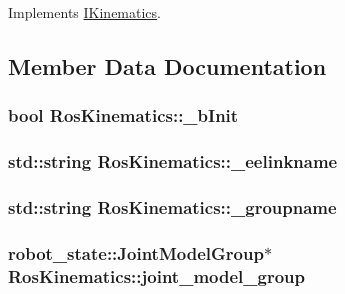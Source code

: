 Implements \hyperlink{classIKinematics_ad43b2185f06e20eb0bf9d5a94d4aec18}{I\-Kinematics}.



\subsection{Member Data Documentation}
\hypertarget{classRosKinematics_a3cae7f7ad57a5df821c2ebf8b55057d5}{
\subsubsection[{\-\_\-b\-Init}]{\setlength{\rightskip}{0pt plus 5cm}bool Ros\-Kinematics\-::\-\_\-b\-Init}}\label{classRosKinematics_a3cae7f7ad57a5df821c2ebf8b55057d5}
\hypertarget{classRosKinematics_ad2aeb76b94edd1bdfb4830eacadebd61}{
\subsubsection[{\-\_\-eelinkname}]{\setlength{\rightskip}{0pt plus 5cm}std\-::string Ros\-Kinematics\-::\-\_\-eelinkname}}\label{classRosKinematics_ad2aeb76b94edd1bdfb4830eacadebd61}
\hypertarget{classRosKinematics_a80fac3df36e85d02b79c83a35e961f78}{
\subsubsection[{\-\_\-groupname}]{\setlength{\rightskip}{0pt plus 5cm}std\-::string Ros\-Kinematics\-::\-\_\-groupname}}\label{classRosKinematics_a80fac3df36e85d02b79c83a35e961f78}
\hypertarget{classRosKinematics_ab6f642bac05e91ab8cf0675232e4cf1b}{
\subsubsection[{joint\-\_\-model\-\_\-group}]{\setlength{\rightskip}{0pt plus 5cm}robot\-\_\-state\-::\-Joint\-Model\-Group$\ast$ Ros\-Kinematics\-::joint\-\_\-model\-\_\-group}}\label{classRosKinematics_ab6f642bac05e91ab8cf0675232e4cf1b}
